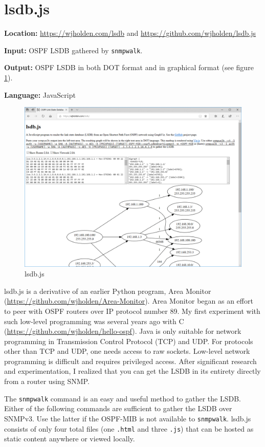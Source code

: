 \documentclass[12pt]{article}
\begin{document}
\section{lsdb.js}

\noindent \textbf{Location:} \url{https://wjholden.com/lsdb} and \url{https://github.com/wjholden/lsdb.js}

\noindent \textbf{Input:} OSPF LSDB gathered by \texttt{snmpwalk}.

\noindent \textbf{Output:} OSPF LSDB in both DOT format and in graphical format (see figure \ref{fig:lsdb}).

\noindent \textbf{Language:} JavaScript

\begin{figure}[h]
\centering
\includegraphics[width=.80\textwidth]{lsdb.PNG}
\caption{lsdb.js}
\label{fig:lsdb}
\end{figure}

lsdb.js is a derivative of an earlier Python program,
Area Monitor (\url{https://github.com/wjholden/Area-Monitor}).
Area Monitor began as an effort to peer with OSPF routers over IP protocol number 89.
My first experiment with such low-level programming was several years ago with C (\url{https://github.com/wjholden/hello-ospf}).
Java is only suitable for network programming in Transmission Control Protocol (TCP) and UDP.
For protocols other than TCP and UDP, one needs access to raw sockets.
Low-level network programming is difficult and requires privileged access.
After significant research and experimentation, I realized that you can get the LSDB in its entirety directly from a router using SNMP.

The \texttt{snmpwalk} command is an easy and useful method to gather the LSDB.
Either of the following commands are sufficient to gather the LSDB over SNMPv3.
Use the latter if the OSPF-MIB is not available to \texttt{snmpwalk}.
lsdb.js consists of only four total files (one \texttt{.html} and three \texttt{.js}) that can be hosted as static content anywhere or viewed locally.
\end{document}
